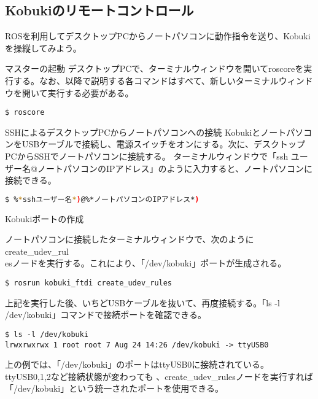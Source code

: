 \begin{itemize}
\section{Kobukiのリモートコントロール}

\setcounter{num}{0}

ROSを利用してデスクトップPCからノートパソコンに動作指令を送り、Kobukiを操縦してみよう。

\circled{\thenum} マスターの起動
デスクトップPCで、ターミナルウィンドウを開いてroscoreを実行する。なお、以降で説明する各コマンドはすべて、新しいターミナルウィンドウを開いて実行する必要がある。

\begin{lstlisting}[language=ROS]
$ roscore
\end{lstlisting}

\circled{\thenum} SSHによるデスクトップPCからノートパソコンへの接続
KobukiとノートパソコンをUSBケーブルで接続し、電源スイッチをオンにする。次に、デスクトップPCからSSHでノートパソコンに接続する。  ターミナルウィンドウで「ssh ユーザー名@ノートパソコンのIPアドレス」のように入力すると、ノートパソコンに接続できる。

\begin{lstlisting}[language=bash]
$ %*sshユーザー名*)@%*ノートパソコンのIPアドレス*)
\end{lstlisting}

\circled{\thenum} Kobukiポートの作成

ノートパソコンに接続したターミナルウィンドウで、次のようにcreate\_udev\_rul\\esノードを実行する。これにより、「/dev/kobuki」ポートが生成される。

\begin{lstlisting}[language=ROS]
$ rosrun kobuki_ftdi create_udev_rules
\end{lstlisting}


上記を実行した後、いちどUSBケーブルを抜いて、再度接続する。「ls -l  /dev/kobuki」コマンドで接続ポートを確認できる。

\begin{lstlisting}[language=ROS]
$ ls -l /dev/kobuki
lrwxrwxrwx 1 root root 7 Aug 24 14:26 /dev/kobuki -> ttyUSB0
\end{lstlisting}


上の例では、「/dev/kobuki」のポートはttyUSB0に接続されている。ttyUSB0,1,2など接続状態が変わっても   、create\_udev\_rulesノードを実行すれば「/dev/kobuki」という統一されたポートを使用できる。\\


\end{itemize}

